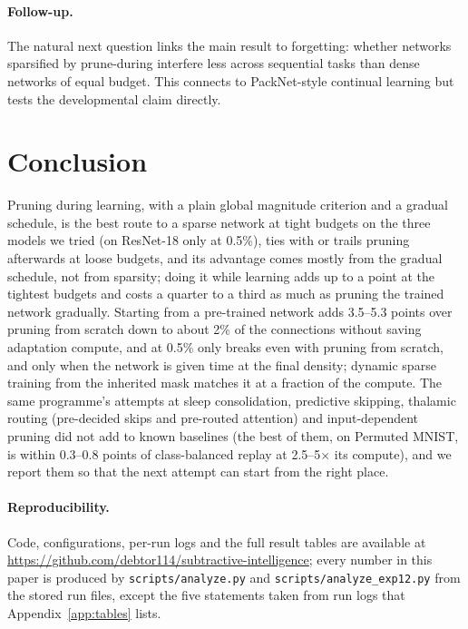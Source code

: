 \documentclass[11pt]{article}
\begin{document}
\paragraph{Follow-up.} The natural next question links the main result to forgetting: whether networks sparsified by
prune-during interfere less across sequential tasks than dense networks of equal budget. This connects to PackNet-style
continual learning \citep{mallya2018,golkar2019} but tests the developmental claim directly.

\section{Conclusion}

Pruning during learning, with a plain global magnitude criterion and a gradual schedule, is the best route to a sparse network
at tight budgets on the three models we tried (on ResNet-18 only at 0.5\%), ties with or trails pruning afterwards at
loose budgets, and its advantage comes mostly
from the gradual schedule, not from sparsity; doing it while learning adds up to a point at the tightest budgets and costs
a quarter to a third as much as pruning the trained network gradually. Starting from a pre-trained network adds 3.5--5.3 points over pruning from scratch
down to about 2\% of the connections without saving adaptation compute, and at 0.5\% only breaks even with pruning from
scratch, and only when the network is given time at the final density; dynamic sparse training from the inherited mask
matches it at a fraction of the compute. The same programme's attempts at sleep consolidation, predictive skipping, thalamic routing (pre-decided skips and
pre-routed attention) and
input-dependent pruning did not add to known baselines (the best of them, on Permuted MNIST, is within 0.3--0.8 points of
class-balanced replay at 2.5--5$\times$ its compute),
and we report them so that the next attempt can start from the right place.

\paragraph{Reproducibility.} Code, configurations, per-run logs and the full result tables are available at
\url{https://github.com/debtor114/subtractive-intelligence};
every number in this paper is produced by \texttt{scripts/analyze.py} and \texttt{scripts/analyze\_exp12.py} from the
stored run files, except the five statements taken from run logs that Appendix~\ref{app:tables} lists.
\end{document}
